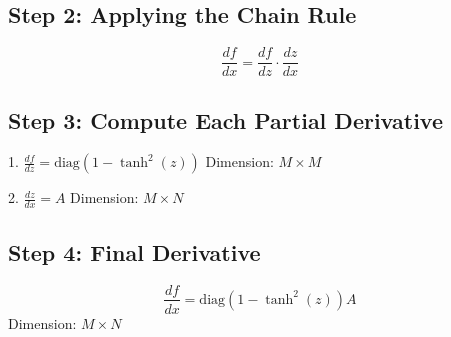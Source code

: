 \documentclass{article}
\begin{document}
\subsection*{Step 2: Applying the Chain Rule}
\[
\frac{df}{dx} = \frac{df}{dz} \cdot \frac{dz}{dx}
\]

\subsection*{Step 3: Compute Each Partial Derivative}
1. \( \frac{df}{dz} = \text{diag}(1 - \tanh^2(z)) \)
   Dimension: \( M \times M \)

2. \( \frac{dz}{dx} = A \)
   Dimension: \( M \times N \)

\subsection*{Step 4: Final Derivative}
\[
\frac{df}{dx} = \text{diag}(1 - \tanh^2(z)) A
\]
Dimension: \( M \times N \)
\end{document}
